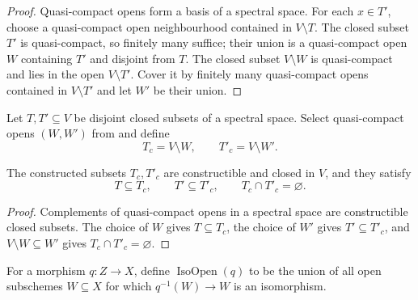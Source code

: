 \begin{proof}
  Quasi-compact opens form a basis of a spectral space.  For each $x\in T'$,
  choose a quasi-compact open neighbourhood contained in $V\setminus T$.
  The closed subset $T'$ is quasi-compact, so finitely many suffice; their
  union is a quasi-compact open $W$ containing $T'$ and disjoint from $T$.
  The closed subset $V\setminus W$ is quasi-compact and lies in the open
  $V\setminus T'$.  Cover it by finitely many quasi-compact opens contained
  in $V\setminus T'$ and let $W'$ be their union.
\end{proof}

\begin{definition}
  \label{def:nagata-spectral-constructible-separation}

  Let $T,T'\subseteq V$ be disjoint closed subsets of a spectral space.
  Select quasi-compact opens $(W,W')$ from
   and define
  \[
    T_c=V\setminus W,
    \qquad
    T'_c=V\setminus W'.
  \]
\end{definition}

\begin{lemma}
  \label{lemma:nagata-spectral-constructible-separation}

  The constructed subsets $T_c,T'_c$ are constructible and closed in $V$,
  and they satisfy
  \[
    T\subseteq T_c,\qquad T'\subseteq T'_c,\qquad
    T_c\cap T'_c=\varnothing.
  \]
\end{lemma}

\begin{proof}
  Complements of quasi-compact opens in a spectral space are constructible
  closed subsets.  The choice of $W$ gives $T\subseteq T_c$, the choice of
  $W'$ gives $T'\subseteq T'_c$, and $V\setminus W\subseteq W'$ gives
  $T_c\cap T'_c=\varnothing$.
\end{proof}

\begin{definition}
  \label{def:nagata-maximal-isomorphism-open}

  For a morphism $q\colon Z\to X$, define $\operatorname{IsoOpen}(q)$ to be
  the union of all open subschemes $W\subseteq X$ for which
  $q^{-1}(W)\to W$ is an isomorphism.
\end{definition}

